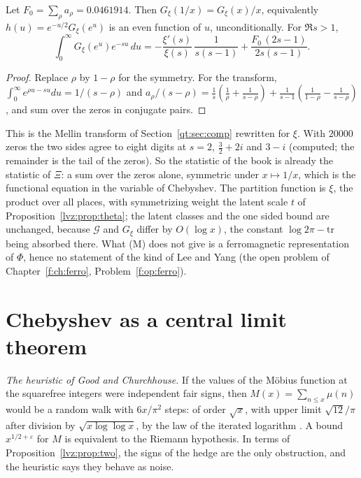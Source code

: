 \begin{proposition}\label{lvz:prop:xi}
Let $F_0=\sum_\rho a_\rho=0.0461914$. Then $G_\xi(1/x)=G_\xi(x)/x$, equivalently $h(u)=e^{-u/2}G_\xi(e^u)$ is an even function of $u$, unconditionally. For $\Re s>1$,
\[
\int_0^\infty G_\xi(e^u)e^{-su}\,du=-\frac{\xi'(s)}{\xi(s)}\,\frac1{s(s-1)}+\frac{F_0\,(2s-1)}{2s(s-1)} .
\]
\end{proposition}

\begin{proof}
Replace $\rho$ by $1-\rho$ for the symmetry. For the transform, $\int_0^\infty e^{\rho u-su}du=1/(s-\rho)$ and $a_\rho/(s-\rho)=\frac1s(\frac1\rho+\frac1{s-\rho})+\frac1{s-1}(\frac1{1-\rho}-\frac1{s-\rho})$, and sum over the zeros in conjugate pairs.
\end{proof}

This is the Mellin transform of Section~\ref{qt:sec:comp} rewritten for $\xi$. With $20000$ zeros the two sides agree to eight digits at $s=2$, $\frac32+2i$ and $3-i$ (computed; the remainder is the tail of the zeros). So the statistic of the book is already the statistic of $\Xi$: a sum over the zeros alone, symmetric under $x\mapsto1/x$, which is the functional equation in the variable of Chebyshev. The partition function is $\xi$, the product over all places, with symmetrizing weight the latent scale $t$ of Proposition~\ref{lvz:prop:theta}; the latent classes and the one sided bound are unchanged, because $\mathcal G$ and $G_\xi$ differ by $O(\log x)$, the constant $\log2\pi-\mathrm{tr}$ being absorbed there. What (M) does not give is a ferromagnetic representation of $\Phi$, hence no statement of the kind of Lee and Yang (the open problem of Chapter~\ref{f:ch:ferro}, Problem~\ref{f:op:ferro}).

\section{Chebyshev as a central limit theorem}\label{lvz:sec:clt}

\emph{The heuristic of Good and Churchhouse.} If the values of the M\"obius function at the squarefree integers were independent fair signs, then $M(x)=\sum_{n\le x}\mu(n)$ would be a random walk with $6x/\pi^2$ steps: of order $\sqrt x$, with upper limit $\sqrt{12}/\pi$ after division by $\sqrt{x\log\log x}$, by the law of the iterated logarithm \cite{GoodChurchhouse68}. A bound $x^{1/2+\varepsilon}$ for $M$ is equivalent to the Riemann hypothesis. In terms of Proposition~\ref{lvz:prop:two}, the signs of the hedge are the only obstruction, and the heuristic says they behave as noise.

